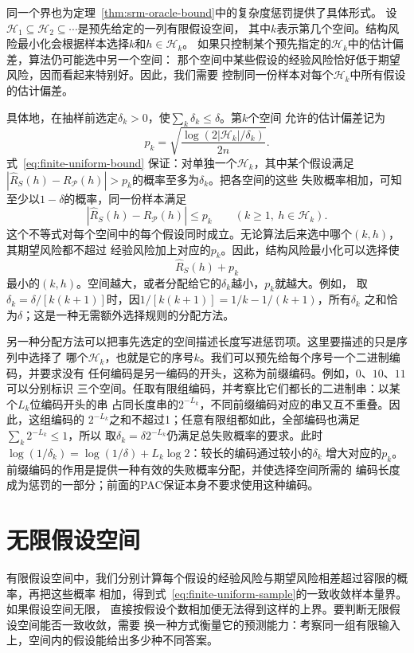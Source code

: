 同一个界也为定理~\ref{thm:srm-oracle-bound}中的复杂度惩罚提供了具体形式。
设$\mathcal H_1\subseteq\mathcal H_2\subseteq\cdots$是预先给定的一列有限假设空间，
其中$k$表示第几个空间。结构风险最小化会根据样本选择$k$和$h\in\mathcal H_k$。
如果只控制某个预先指定的$\mathcal H_k$中的估计偏差，算法仍可能选中另一个空间：
那个空间中某些假设的经验风险恰好低于期望风险，因而看起来特别好。因此，我们需要
控制同一份样本对每个$\mathcal H_k$中所有假设的估计偏差。

具体地，在抽样前选定$\delta_k>0$，使$\sum_k\delta_k\leq\delta$。第$k$个空间
允许的估计偏差记为
\[
 p_k=\sqrt{\frac{\log(2|\mathcal H_k|/\delta_k)}{2n}}.
\]
式~\eqref{eq:finite-uniform-bound}
保证：对单独一个$\mathcal H_k$，其中某个假设满足
$|\hat R_S(h)-R_{\mathcal P}(h)|>p_k$的概率至多为$\delta_k$。把各空间的这些
失败概率相加，可知至少以$1-\delta$的概率，同一份样本满足
\[
 |\hat R_S(h)-R_{\mathcal P}(h)|\leq p_k
 \qquad(k\geq1,\ h\in\mathcal H_k).
\]
这个不等式对每个空间中的每个假设同时成立。无论算法后来选中哪个$(k,h)$，其期望风险都不超过
经验风险加上对应的$p_k$。因此，结构风险最小化可以选择使
\begin{equation}
 \hat R_S(h)+p_k
 \label{eq:srm-finite-penalty}
\end{equation}
最小的$(k,h)$。空间越大，或者分配给它的$\delta_k$越小，$p_k$就越大。例如，
取$\delta_k=\delta/[k(k+1)]$时，因$1/[k(k+1)]=1/k-1/(k+1)$，所有$\delta_k$
之和恰为$\delta$；这是一种无需额外选择规则的分配方法。

另一种分配方法可以把事先选定的空间描述长度写进惩罚项。这里要描述的只是序列中选择了
哪个$\mathcal H_k$，也就是它的序号$k$。我们可以预先给每个序号一个二进制编码，并要求没有
任何编码是另一编码的开头，这称为前缀编码。例如，$0$、$10$、$11$可以分别标识
三个空间。任取有限组编码，并考察比它们都长的二进制串：以某个$L_k$位编码开头的串
占同长度串的$2^{-L_k}$，不同前缀编码对应的串又互不重叠。因此，这组编码的
$2^{-L_k}$之和不超过1；任意有限组都如此，全部编码也满足
$\sum_k2^{-L_k}\leq1$，所以
取$\delta_k=\delta2^{-L_k}$仍满足总失败概率的要求。此时
$\log(1/\delta_k)=\log(1/\delta)+L_k\log2$：较长的编码通过较小的$\delta_k$
增大对应的$p_k$。前缀编码的作用是提供一种有效的失败概率分配，并使选择空间所需的
编码长度成为惩罚的一部分；前面的PAC保证本身不要求使用这种编码。

\section{无限假设空间}
\label{sec:binary-infinite-class}

有限假设空间中，我们分别计算每个假设的经验风险与期望风险相差超过容限的概率，再把这些概率
相加，得到式~\eqref{eq:finite-uniform-sample}的一致收敛样本量界。如果假设空间无限，
直接按假设个数相加便无法得到这样的上界。要判断无限假设空间能否一致收敛，需要
换一种方式衡量它的预测能力：考察同一组有限输入上，空间内的假设能给出多少种不同答案。

